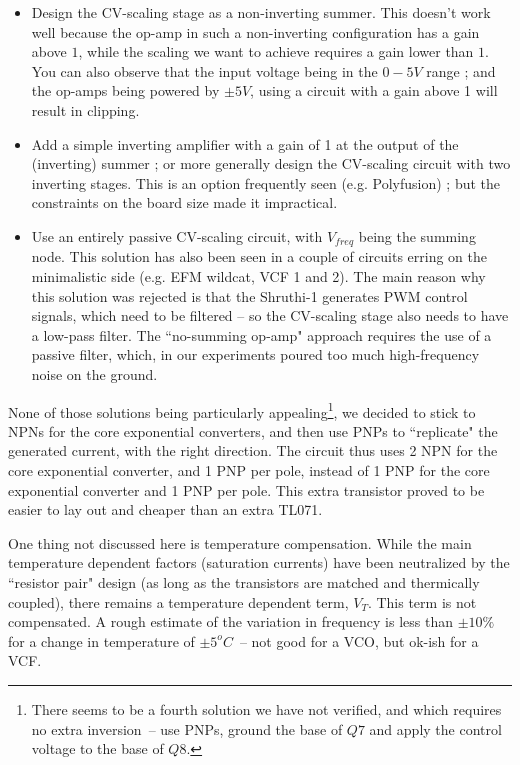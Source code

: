 \documentclass[a4paper,11pt]{article}
\begin{document}
\begin{itemize}
\item Design the CV-scaling stage as a non-inverting summer. This doesn't work well because the op-amp in such a non-inverting configuration has a gain above $1$, while the scaling we want to achieve requires a gain lower than $1$. You can also observe that the input voltage being in the $0-5V$ range ; and the op-amps being powered by $\pm 5V$, using a circuit with a gain above 1 will result in clipping.
\item Add a simple inverting amplifier with a gain of 1 at the output of the (inverting) summer ; or more generally design the CV-scaling circuit with two inverting stages. This is an option frequently seen (e.g. Polyfusion) ; but the constraints on the board size made it impractical.
\item Use an entirely passive CV-scaling circuit, with $V_{freq}$ being the summing node. This solution has also been seen in a couple of circuits erring on the minimalistic side (e.g. EFM wildcat, VCF 1 and 2). The main reason why this solution was rejected is that the Shruthi-1 generates PWM control signals, which need to be filtered -- so the CV-scaling stage also needs to have a low-pass filter. The ``no-summing op-amp" approach requires the use of a passive filter, which, in our experiments poured too much high-frequency noise on the ground.
\end{itemize}

None of those solutions being particularly appealing\footnote{There seems to be a fourth solution we have not verified, and which requires no extra inversion~-- use PNPs, ground the base of $Q7$ and apply the control voltage to the base of $Q8$.}, we decided to stick to NPNs for the core exponential converters, and then use PNPs to ``replicate" the generated current, with the right direction. The circuit thus uses 2 NPN for the core exponential converter, and 1 PNP per pole, instead of 1 PNP for the core exponential converter and 1 PNP per pole. This extra transistor proved to be easier to lay out and cheaper than an extra TL071.

One thing not discussed here is temperature compensation. While the main temperature dependent factors (saturation currents) have been neutralized by the ``resistor pair" design (as long as the transistors are matched and thermically coupled), there remains a temperature dependent term, $V_T$. This term is not compensated. A rough estimate of the variation in frequency is less than $\pm 10\%$ for a change in temperature of $\pm 5^oC$~-- not good for a VCO, but ok-ish for a VCF.
\end{document}
